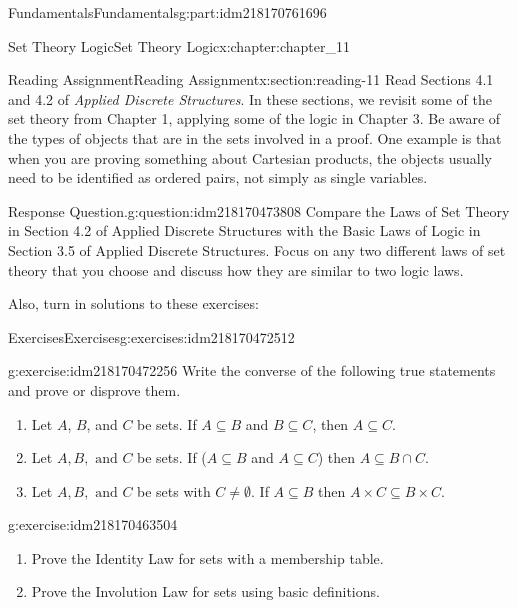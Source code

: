 \documentclass[oneside,10pt,]{book}
\numberwithin{equation}{section}
\begin{document}
\begin{partptx}{Fundamentals}{}{Fundamentals}{}{}{g:part:idm218170761696}
\begin{chapterptx}{Set Theory Logic}{}{Set Theory Logic}{}{}{x:chapter:chapter_11}
\begin{sectionptx}{Reading Assignment}{}{Reading Assignment}{}{}{x:section:reading-11}
Read Sections 4.1  and 4.2 of \emph{Applied Discrete Structures}.  In these sections, we revisit some of the set theory from Chapter 1, applying some of the logic in Chapter 3. Be aware of the types of objects that are in the sets involved in a proof.  One example is that when you are proving something about Cartesian products, the objects usually need to be identified as ordered pairs, not simply as single variables.%
\begin{question}{Response Question.}{g:question:idm218170473808}%
Compare the Laws of Set Theory in Section 4.2 of Applied Discrete Structures with the Basic Laws of Logic in Section 3.5 of Applied Discrete Structures.  Focus on any two different laws of set theory that you choose and discuss how they are similar to two logic laws.%
\end{question}
Also, turn in solutions to these exercises:%
%
%
\typeout{************************************************}
\typeout{************************************************}
%
\begin{exercises-subsection-numberless}{Exercises}{}{Exercises}{}{}{g:exercises:idm218170472512}
\par\medskip\noindent%
%
\begin{exercisegroup}
\begin{divisionexerciseeg}{1}{}{}{g:exercise:idm218170472256}%
Write the converse of the following true statements and prove or disprove them.%
\begin{enumerate}[label=(\alph*)]
\item{}Let \(A\), \(B\), and \(C\) be sets. If \(A\subseteq B\) and \(B\subseteq C\), then \(A\subseteq C\).%
\item{}Let \(A,B, \textrm{ and } C\) be sets. If (\(A\subseteq B\) and \(A\subseteq C\)) then \(A\subseteq B\cap C\).%
\item{}Let \(A,B, \textrm{ and } C\) be sets with \(C\neq \emptyset\). If \(A\subseteq B\) then \(A\times C \subseteq B\times C\).%
\end{enumerate}
%
\end{divisionexerciseeg}%
\begin{divisionexerciseeg}{2}{}{}{g:exercise:idm218170463504}%
%
\begin{enumerate}[label=(\alph*)]
\item{}Prove the Identity Law for sets  with a membership table.%
\item{}Prove the Involution Law  for sets using basic definitions.%
\end{enumerate}

\end{divisionexerciseeg}
\end{exercisegroup}
\end{exercises-subsection-numberless}
\end{sectionptx}
\end{chapterptx}
\end{partptx}
\end{document}
